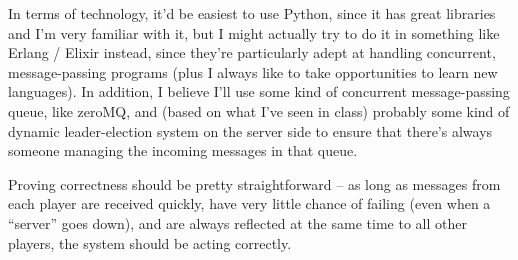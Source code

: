 \documentclass[letterpaper]{article}
\begin{document}
	In terms of technology, it'd be easiest to use Python, since it has great libraries and I'm very familiar with it, but I might actually try to do it in something like Erlang / Elixir instead, since they're particularly adept at handling concurrent, message-passing programs (plus I always like to take opportunities to learn new languages). In addition, I believe I'll use some kind of concurrent message-passing queue, like zeroMQ, and (based on what I've seen in class) probably some kind of dynamic leader-election system on the server side to ensure that there's always someone managing the incoming messages in that queue. 

	Proving correctness should be pretty straightforward -- as long as messages from each player are received quickly, have very little chance of failing (even when a ``server'' goes down), and are always reflected at the same time to all other players, the system should be acting correctly.
\end{document}
